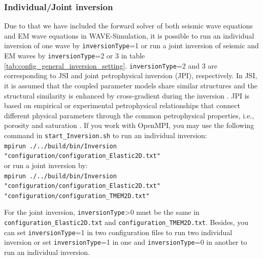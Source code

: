 \documentclass[pdftex,a4paper,parskip,listof=totoc,bibliography=totoc,onehalfspacing,12pt]{scrreprt}
\newcommand{\shellcmd}[1]{\indent\indent\texttt{#1}}	%
\newcommand{\shellcmdline}[1]{\indent\indent\texttt{\quad#1}} 	%
\begin{document}
\subsubsection{Individual/Joint inversion} 
Due to that we have included the forward solver of both seismic wave equations and EM wave equations in WAVE-Simulation, it is possible to run an individual inversion of one wave by \verb+inversionType+=1 or run a joint inversion of seismic and EM waves by \verb+inversionType+=2 or 3 in table \ref{tab:config_general_inversion_setting}. \verb+inversionType+=2 and 3 are corresponding to JSI and joint petrophysical inversion (JPI), respectively. In JSI, it is assumed that the coupled parameter models share similar structures and the structural similarity is enhanced by cross-gradient during the inversion \citep{gallardo2003characterization}. JPI is based on empirical or experimental petrophysical relationships that connect different physical parameters through the common petrophysical properties, i.e., porosity and saturation \citep{qin2021joint}. If you work with OpenMPI, you may use the following command in \shellcmdline{start\_Inversion.sh} to run an individual inversion:\\
    \shellcmd{mpirun ./../build/bin/Inversion "configuration/configuration\_Elastic2D.txt"}\\
or run a joint inversion by:\\
    \shellcmd{mpirun ./../build/bin/Inversion "configuration/configuration\_Elastic2D.txt" "configuration/configuration\_TMEM2D.txt"}
    
For the joint inversion, \verb+inversionType+>0 must be the same in \shellcmd{configuration\_Elastic2D.txt} and \shellcmd{configuration\_TMEM2D.txt}. Besides, you can set \verb+inversionType+=1 in two configuration files to run two individual inversion or set \verb+inversionType+=1 in one and \verb+inversionType+=0 in another to run an individual inversion.
\end{document}
